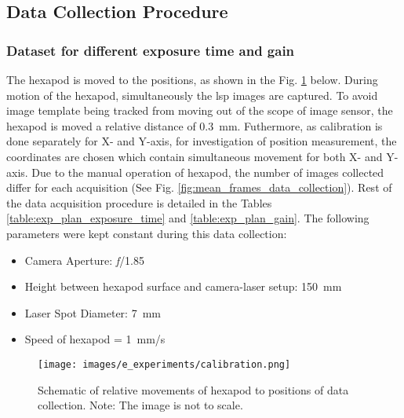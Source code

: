     \subsection*{Data Collection Procedure}\label{subsection:data_collection_procedure}
        \subsubsection{Dataset for different exposure time and gain}
            The hexapod is moved to the positions, as shown in the Fig. \ref{fig:testing_2.png} below. During motion of the hexapod, simultaneously the \gls{lsp} images are captured. To avoid image template being tracked from moving out of the scope of image sensor, the hexapod is moved a relative distance of \SI{0.3}{\milli\meter}. Futhermore, as calibration is done separately for X- and Y-axis, for investigation of position measurement, the coordinates are chosen which contain simultaneous movement for both X- and Y-axis. Due to the manual operation of hexapod, the number of images collected differ for each acquisition (See Fig. \ref{fig:mean_frames_data_collection}). Rest of the data acquisition procedure is detailed in the Tables \ref{table:exp_plan_exposure_time} and \ref{table:exp_plan_gain}. The following parameters were kept constant during this data collection:
            
            \begin{itemize}
                \item Camera Aperture: \emph{f}/1.85
                \item Height between hexapod surface and camera-laser setup: \SI{150}{\milli\meter}
                \item Laser Spot Diameter: \SI{7}{\milli\meter}
                \item Speed of hexapod = \SI{1}{\milli\meter/\second}
            \end{itemize}

            \begin{figure}[ht]
                \centering
                \texttt{[image: images/e\_experiments/calibration.png]}
                \caption{Schematic of relative movements of hexapod to positions of data collection. Note: The image is not to scale.}
                \label{fig:testing_2.png}
            \end{figure}

